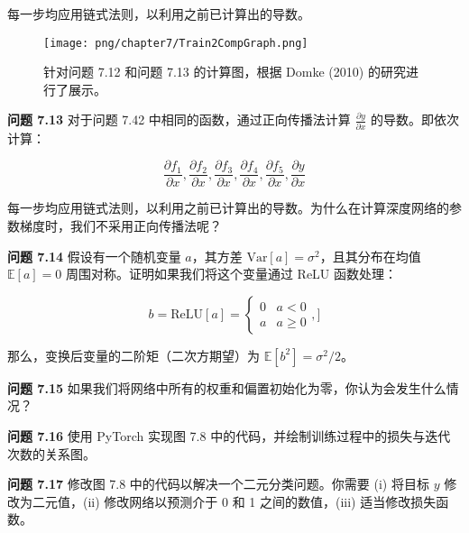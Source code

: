 每一步均应用链式法则，以利用之前已计算出的导数。

\begin{figure}[ht!]
\centering
\texttt{[image: png/chapter7/Train2CompGraph.png]}
\caption{针对问题 7.12 和问题 7.13 的计算图，根据 Domke (2010) 的研究进行了展示。}
\end{figure}

\textbf{问题 7.13} 对于问题 7.42 中相同的函数，通过正向传播法计算 \(\frac{\partial y}{\partial x}\) 的导数。即依次计算：

\begin{equation}
\frac{\partial f_1}{\partial x}, \frac{\partial f_2}{\partial x}, \frac{\partial f_3}{\partial x}, \frac{\partial f_4}{\partial x}, \frac{\partial f_5}{\partial x}, \frac{\partial y}{\partial x} 
\end{equation}

每一步均应用链式法则，以利用之前已计算出的导数。为什么在计算深度网络的参数梯度时，我们不采用正向传播法呢？

\textbf{问题 7.14} 假设有一个随机变量 \(a\)，其方差 \(\text{Var}[a] = \sigma^2\)，且其分布在均值 \(\mathbb{E}[a] = 0\) 周围对称。证明如果我们将这个变量通过 ReLU 函数处理：

\begin{equation}
b = \text{ReLU}[a] = \begin{cases}
0 & a < 0 \\
a & a \geq 0
\end{cases}, ]
\end{equation}

那么，变换后变量的二阶矩（二次方期望）为 \(\mathbb{E}[b^2] = \sigma^2/2\)。

\textbf{问题 7.15} 如果我们将网络中所有的权重和偏置初始化为零，你认为会发生什么情况？

\textbf{问题 7.16} 使用 PyTorch 实现图 7.8 中的代码，并绘制训练过程中的损失与迭代次数的关系图。

\textbf{问题 7.17} 修改图 7.8 中的代码以解决一个二元分类问题。你需要 (i) 将目标 \(y\) 修改为二元值，(ii) 修改网络以预测介于 0 和 1 之间的数值，(iii) 适当修改损失函数。

